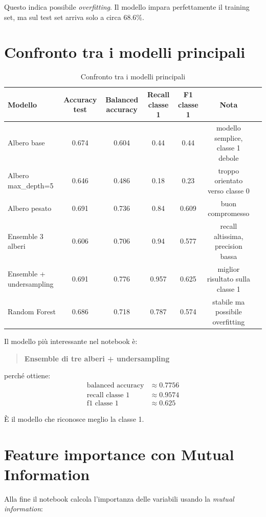 \documentclass[11pt,a4paper]{article}
\begin{document}
Questo indica possibile \textit{overfitting}. Il modello impara perfettamente il training set, ma sul test set arriva solo a circa 68.6\%.

\section{Confronto tra i modelli principali}
\begin{table}[H]
\centering
\caption{Confronto tra i modelli principali}
\label{tab:model_comparison}
\begin{tabular}{>{\raggedright\arraybackslash}p{4cm}ccccc>{\raggedright\arraybackslash}p{4cm}}
\toprule
\textbf{Modello} & \textbf{Accuracy test} & \textbf{Balanced accuracy} & \textbf{Recall classe 1} & \textbf{F1 classe 1} & \textbf{Nota} \\
\midrule
Albero base & 0.674 & 0.604 & 0.44 & 0.44 & modello semplice, classe 1 debole \\
Albero max\_depth=5 & 0.646 & 0.486 & 0.18 & 0.23 & troppo orientato verso classe 0 \\
Albero pesato & 0.691 & 0.736 & 0.84 & 0.609 & buon compromesso \\
Ensemble 3 alberi & 0.606 & 0.706 & 0.94 & 0.577 & recall altissima, precision bassa \\
Ensemble + undersampling & 0.691 & 0.776 & 0.957 & 0.625 & miglior risultato sulla classe 1 \\
Random Forest & 0.686 & 0.718 & 0.787 & 0.574 & stabile ma possibile overfitting \\
\bottomrule
\end{tabular}
\end{table}

Il modello più interessante nel notebook è:
\begin{quote}
    \textbf{Ensemble di tre alberi + undersampling}
\end{quote}

perché ottiene:
\begin{align*}
    \text{balanced accuracy} &\approx 0.7756 \\
    \text{recall classe 1} &\approx 0.9574 \\
    \text{f1 classe 1} &\approx 0.625
\end{align*}

È il modello che riconosce meglio la classe 1.

\section{Feature importance con Mutual Information}
Alla fine il notebook calcola l'importanza delle variabili usando la \textit{mutual information}:
\end{document}
